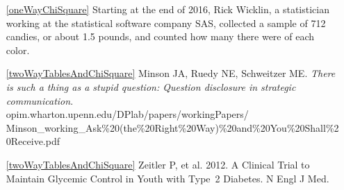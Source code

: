 \begin{itemize}
\item[\ref{oneWayChiSquare}]
   Starting at the end of 2016, Rick Wicklin, a statistician working at the statistical software company SAS, collected a sample of 712 candies, or about 1.5 pounds, and counted how many there were of each color.   \\



\item[\ref{twoWayTablesAndChiSquare}]
    Minson JA, Ruedy NE, Schweitzer ME.
    \emph{There is such a thing as a stupid question:
    Question disclosure in strategic communication}. \\
    {\small{}
        {opim.wharton.upenn.edu/DPlab/papers/workingPapers/}}\\
    {\small{}
        {Minson\_working\_Ask\%20(the\%20Right\%20Way)\%20and\%20You\%20Shall\%20Receive.pdf}}

\item[\ref{twoWayTablesAndChiSquare}]
    Zeitler P, et al. 2012.
    A Clinical Trial to Maintain Glycemic Control in Youth
    with Type~2 Diabetes.
    N Engl J Med.

\end{itemize}






\D{\newpage}


